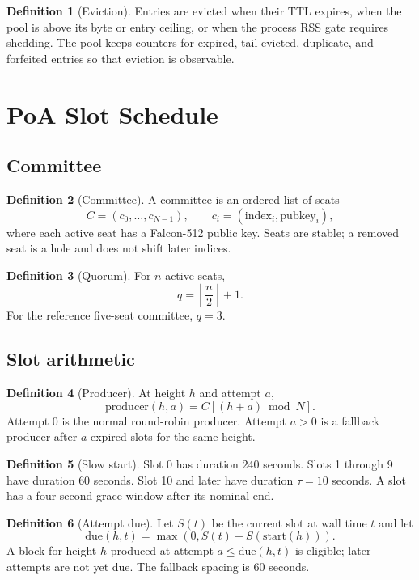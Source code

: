 \documentclass[11pt,a4paper]{article}
\theoremstyle{definition}
\newtheorem{definition}{Definition}[section]
\theoremstyle{plain}
\begin{document}
\begin{definition}[Eviction]
Entries are evicted when their TTL expires, when the pool is above its byte or
entry ceiling, or when the process RSS gate requires shedding. The pool keeps
counters for expired, tail-evicted, duplicate, and forfeited entries so that
eviction is observable.
\end{definition}

\section{PoA Slot Schedule}

\subsection{Committee}

\begin{definition}[Committee]
A committee is an ordered list of seats
\[
  C=(c_0,\dots,c_{N-1}),\qquad c_i=(\mathrm{index}_i,\mathrm{pubkey}_i),
\]
where each active seat has a Falcon-512 public key. Seats are stable; a
removed seat is a hole and does not shift later indices.
\end{definition}

\begin{definition}[Quorum]
For $n$ active seats,
\[
  q=\left\lfloor\frac{n}{2}\right\rfloor+1.
\]
For the reference five-seat committee, $q=3$.
\end{definition}

\subsection{Slot arithmetic}

\begin{definition}[Producer]
At height $h$ and attempt $a$,
\[
  \mathrm{producer}(h,a)=C[(h+a)\bmod N].
\]
Attempt 0 is the normal round-robin producer. Attempt $a>0$ is a fallback
producer after $a$ expired slots for the same height.
\end{definition}

\begin{definition}[Slow start]
Slot 0 has duration $240$ seconds. Slots 1 through 9 have duration $60$
seconds. Slot 10 and later have duration $\tau=10$ seconds. A slot has a
four-second grace window after its nominal end.
\end{definition}

\begin{definition}[Attempt due]
Let $S(t)$ be the current slot at wall time $t$ and let
\[
  \mathrm{due}(h,t)=\max\left(0,S(t)-S(\mathrm{start}(h))\right).
\]
A block for height $h$ produced at attempt $a\le \mathrm{due}(h,t)$ is
eligible; later attempts are not yet due. The fallback spacing is 60 seconds.
\end{definition}
\end{document}
